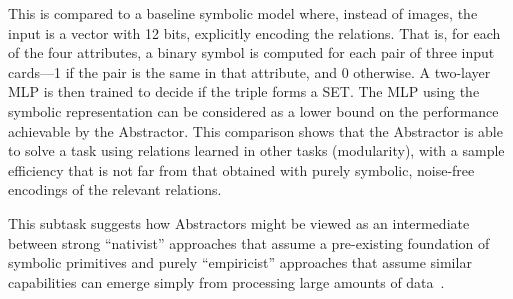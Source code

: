 This is compared to a baseline symbolic model where, instead of images, the input is a vector with 12 bits,
explicitly encoding the relations. That is, for each of the four attributes, a binary symbol is computed for each pair of three input cards---1 if the pair is the same in that attribute, and 0 otherwise. A two-layer MLP is then trained to decide if the triple forms a SET. The MLP using the symbolic representation can be considered as a lower bound on the performance achievable by the Abstractor. This comparison shows that the Abstractor is able to solve a task using relations learned in other tasks (modularity), with a sample efficiency that is not far from that obtained
with purely symbolic, noise-free encodings of the relevant relations. %

This subtask suggests how Abstractors might be viewed as an intermediate between strong ``nativist'' approaches that assume a pre-existing foundation of symbolic primitives and purely ``empiricist'' approaches that assume
similar capabilities can emerge simply from processing large amounts of data~\citep{lake2015}.
